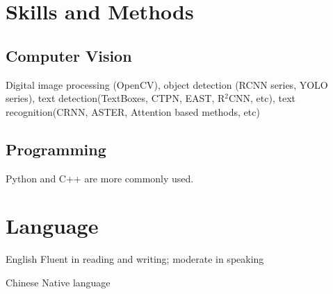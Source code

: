 \documentclass[12pt,letterpaper]{report}
\newcommand{\listitemspace}{0.15em}%
\newenvironment{desp}
{\begin{list}{}{\setlength{\leftmargin}{0em}
			\setlength{\parskip}{0em}
			\setlength{\itemsep}{\listitemspace}
			\setlength{\parsep}{\listitemspace}}}
	{\end{list}}
\begin{document}
	\section*{Skills and Methods}

	 \subsection*{Computer Vision}
	   \begin{desp}
	     \item Digital image processing (OpenCV), object detection (RCNN series, YOLO series), text detection(TextBoxes, CTPN, EAST, R$^2$CNN, etc), text recognition(CRNN, ASTER, Attention based methods, etc)
	   \end{desp}
	 \subsection*{Programming}
	   \begin{desp}
       \item Python and C++ are more commonly used.
	   \end{desp}

  \section*{Language}

  \begin{tablist}
    \item[English] \tab Fluent in reading and writing; moderate in speaking
		\item[Chinese] \tab Native language
	\end{tablist}

	\begin{center}
		\vspace{6em}
	\end{center}
\end{document}
